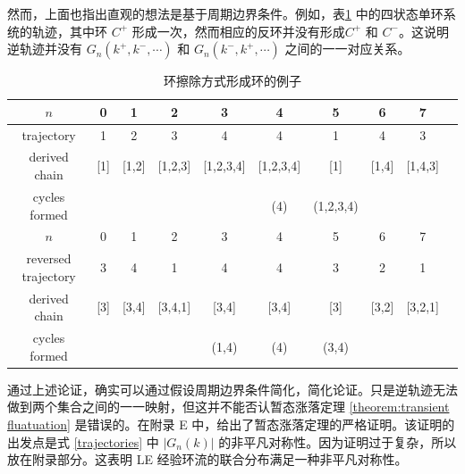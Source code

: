 然而，上面也指出直观的想法是基于周期边界条件。例如，表\ref{example} 中的四状态单环系统的轨迹，其中环 $C^+$ 形成一次，然而相应的反环并没有形成$C^+$ 和 $C^-$。这说明逆轨迹并没有 $G_n(k^+,k^-,\cdots)$ 和 $G_n(k^-,k^+,\cdots)$ 之间的一一对应关系。
\begin{table}[htb!]
\renewcommand\arraystretch{1.3}\centering
\begin{tabular}{cccccccccc} \hline\hline
$n$                 & 0   & 1     & 2       & 3         & 4         & 5         & 6     & 7       \\ \hline
trajectory          & 1   & 2     & 3       & 4         & 4         & 1         & 4     & 3       \\ \hline
derived chain       & [1] & [1,2] & [1,2,3] & [1,2,3,4] & [1,2,3,4] & [1]       & [1,4] & [1,4,3] \\ \hline
cycles formed       &     &       &         &           & (4)       & (1,2,3,4) &       &         \\ \hline\hline
$n$                 & 0   & 1     & 2       & 3     & 4     & 5     & 6     & 7       \\ \hline
reversed trajectory & 3   & 4     & 1       & 4     & 4     & 3     & 2     & 1       \\ \hline
derived chain       & [3] & [3,4] & [3,4,1] & [3,4] & [3,4] & [3]   & [3,2] & [3,2,1] \\ \hline
cycles formed       &     &       &         & (1,4) & (4)   & (3,4) &       &         \\ \hline\hline
\end{tabular}
\caption{环擦除方式形成环的例子}\label{example}
\end{table}
通过上述论证，确实可以通过假设周期边界条件简化，简化论证。只是逆轨迹无法做到两个集合之间的一一映射，但这并不能否认暂态涨落定理 \eqref{theorem:transient fluatuation} 是错误的。在附录 E 中，给出了暂态涨落定理的严格证明。该证明的出发点是式 \eqref{trajectories} 中 $|G_n(k)|$ 的非平凡对称性。因为证明过于复杂，所以放在附录部分。这表明 LE 经验环流的联合分布满足一种非平凡对称性。

